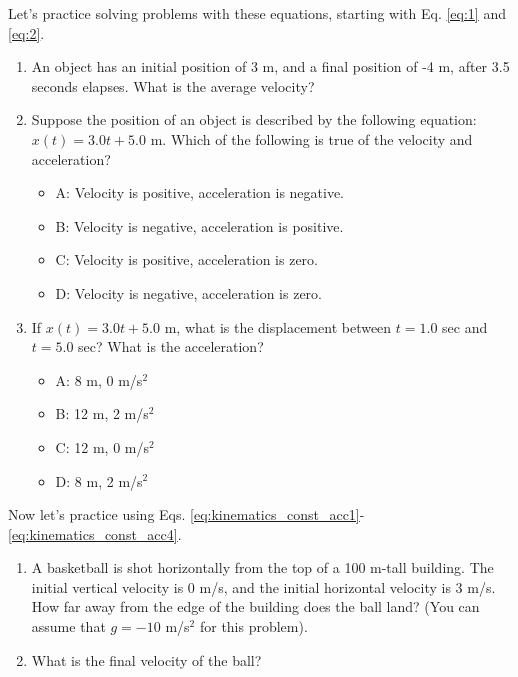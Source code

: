 \documentclass[10pt]{article}
\begin{document}
Let's practice solving problems with these equations, starting with Eq. \ref{eq:1} and \ref{eq:2}.
\begin{enumerate}
\item An object has an initial position of 3 m, and a final position of -4 m, after 3.5 seconds elapses.  What is the average velocity? \\ \hspace{0.75cm}
\item Suppose the position of an object is described by the following equation: $x(t) = 3.0 t + 5.0$ m.  Which of the following is true of the velocity and acceleration?
\begin{itemize}
\item A: Velocity is positive, acceleration is negative.
\item B: Velocity is negative, acceleration is positive.
\item C: Velocity is positive, acceleration is zero.
\item D: Velocity is negative, acceleration is zero.
\end{itemize}
\item If $x(t) = 3.0 t + 5.0$ m, what is the displacement between $t=1.0$ sec and $t=5.0$ sec? What is the acceleration?
\begin{itemize}
\item A: 8 m, 0 m/s$^2$
\item B: 12 m, 2 m/s$^2$
\item C: 12 m, 0 m/s$^2$
\item D: 8 m, 2 m/s$^2$
\end{itemize}
\end{enumerate}
Now let's practice using Eqs. \ref{eq:kinematics_const_acc1}-\ref{eq:kinematics_const_acc4}.  
\begin{enumerate}
\item A basketball is shot horizontally from the top of a 100 m-tall building.  The initial vertical velocity is 0 m/s, and the initial horizontal velocity is 3 m/s.  How far away from the edge of the building does the ball land?  (You can assume that $g = -10$ m/s$^2$ for this problem). \\ \vspace{2cm}
\item What is the final velocity of the ball? \\ \vspace{1cm}
\end{enumerate}
\end{document}
